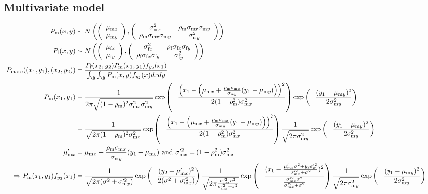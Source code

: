 \documentclass{article}\usepackage[]{graphicx}\usepackage[]{color}
\newcommand{\x}[1]{\text{#1}}
\begin{document}
\subsection{Multivariate model} 
\begin{landscape}
\begin{align*}
P_\x{m}(x,y)&\sim N\left(\left(\begin{array}{cc} \mu_{\x{m}x} \\ \mu_{\x{m}y}  \end{array}\right),\left(\begin{array}{cccc}\sigma_{\x{m}x}^2 & \rho_\x{m}\sigma_{\x{m}x}\sigma_{\x{m}y} \\  \rho_\x{m}\sigma_{\x{m}x}\sigma_{\x{m}y} & \sigma_{\x{m}y}^2\end{array}\right)\right)
\\P_\x{f}(x,y)&\sim N\left(\left(\begin{array}{cc} \mu_{\x{f}x} \\ \mu_{\x{f}y}  \end{array}\right),\left(\begin{array}{cccc}\sigma_{\x{f}x}^2 & \rho_\x{f}\sigma_{\x{f}x}\sigma_{\x{f}y} \\  \rho_\x{f}\sigma_{\x{f}x}\sigma_{\x{f}y} & \sigma_{\x{f}y}^2\end{array}\right)\right)
\\ P_\x{mate}((x_1,y_1),(x_2,y_2))&=\frac{P_\x{f}(x_2,y_2)P_\x{m}(x_1,y_1)f_{y_2}(x_1)}{\int_\R\int_\R P_\x{m}(x,y)f_{y_2}(x)dxdy}
\\ P_\x{m}(x_1,y_1)&=\frac{1}{2\pi\sqrt{(1-\rho_\x{m})^2\sigma_{\x{m}x}^2\sigma_{\x{m}y}^2}}\exp\left(-\frac{\left(x_1-\left(\mu_{\x{m}x}+\frac{\rho_\x{m}\sigma_{\x{m}x}}{\sigma_{\x{m}y}}(y_1-\mu_{\x{m}y})\right)\right)^2}{2(1-\rho_\x{m}^2)\sigma_{\x{m}x}^2}\right)\exp\left(-\frac{(y_1-\mu_{\x{m}y})^2}{2\sigma_{\x{m}y}^2}\right)
\\&=\frac{1}{\sqrt{2\pi(1-\rho_\x{m})^2\sigma_{\x{m}x}^2}}\exp\left(-\frac{\left(x_1-\left(\mu_{\x{m}x}+\frac{\rho_\x{m}\sigma_{\x{m}x}}{\sigma_{\x{m}y}}(y_1-\mu_{\x{m}y})\right)\right)^2}{2(1-\rho_\x{m}^2)\sigma_{\x{m}x}^2}\right)\frac{1}{\sqrt{2\pi\sigma_{\x{m}y}^2}}\exp\left(-\frac{(y_1-\mu_{\x{m}y})^2}{2\sigma_{\x{m}y}^2}\right)
\\ \mu_{\x{m}x}'&=\mu_{\x{m}x}+\frac{\rho_\x{m}\sigma_{\x{m}x}}{\sigma_{\x{m}y}}(y_1-\mu_{\x{m}y}) \text{ and } \sigma_{\x{m}x}'^2=(1-\rho_\x{m}^2)\sigma_{\x{m}x}^2
\\ \Rightarrow P_\x{m}(x_1,y_1)f_{y_2}(x_1)&=\frac{1}{\sqrt{2\pi(\sigma^2+\sigma_{\x{m}x}'^2)}}\exp\left(-\frac{(y_2-\mu_{\x{m}x}')^2}{2(\sigma^2+\sigma_{\x{m}x}'^2)}\right)\frac{1}{\sqrt{2\pi\frac{\sigma_{\x{m}x}'^2\sigma^2}{\sigma_{\x{m}x}'^2+\sigma^2}}}\exp\left(-\frac{(x_1-\frac{\mu_{\x{m}x}'\sigma^2+y_2\sigma_\x{m}'^2}{\sigma_{\x{m}x}'^2+\sigma^2})^2}{\frac{\sigma_{\x{m}x}'^2\sigma^2}{\sigma_{\x{m}x}'^2+\sigma^2}}\right)\frac{1}{\sqrt{2\pi\sigma_{\x{m}y}^2}}\exp\left(-\frac{(y_1-\mu_{\x{m}y})^2}{2\sigma_{\x{m}y}^2}\right)

\end{align*}
\end{landscape}
\end{document}
